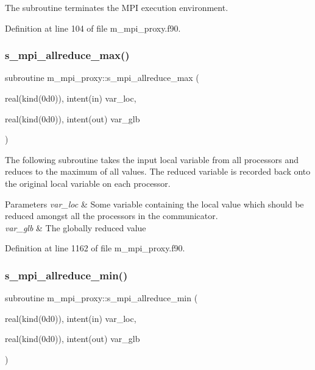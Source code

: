 The subroutine terminates the M\+PI execution environment. 



Definition at line 104 of file m\+\_\+mpi\+\_\+proxy.\+f90.

\mbox{\label{namespacem__mpi__proxy_aff7286de058c49b2a5d7a84be1983e8f}} 
\subsubsection{\texorpdfstring{s\+\_\+mpi\+\_\+allreduce\+\_\+max()}{s\_mpi\_allreduce\_max()}}
{\footnotesize\ttfamily subroutine m\+\_\+mpi\+\_\+proxy\+::s\+\_\+mpi\+\_\+allreduce\+\_\+max (\begin{DoxyParamCaption}\item[{real(kind(0d0)), intent(in)}]{var\+\_\+loc,  }\item[{real(kind(0d0)), intent(out)}]{var\+\_\+glb }\end{DoxyParamCaption})}



The following subroutine takes the input local variable from all processors and reduces to the maximum of all values. The reduced variable is recorded back onto the original local variable on each processor. 


\begin{DoxyParams}{Parameters}
{\em var\+\_\+loc} & Some variable containing the local value which should be reduced amongst all the processors in the communicator. \\
\hline
{\em var\+\_\+glb} & The globally reduced value \\
\hline
\end{DoxyParams}


Definition at line 1162 of file m\+\_\+mpi\+\_\+proxy.\+f90.

\mbox{\label{namespacem__mpi__proxy_a398a372625502c0430a64e0bb23e2342}} 
\subsubsection{\texorpdfstring{s\+\_\+mpi\+\_\+allreduce\+\_\+min()}{s\_mpi\_allreduce\_min()}}
{\footnotesize\ttfamily subroutine m\+\_\+mpi\+\_\+proxy\+::s\+\_\+mpi\+\_\+allreduce\+\_\+min (\begin{DoxyParamCaption}\item[{real(kind(0d0)), intent(in)}]{var\+\_\+loc,  }\item[{real(kind(0d0)), intent(out)}]{var\+\_\+glb }\end{DoxyParamCaption})}




